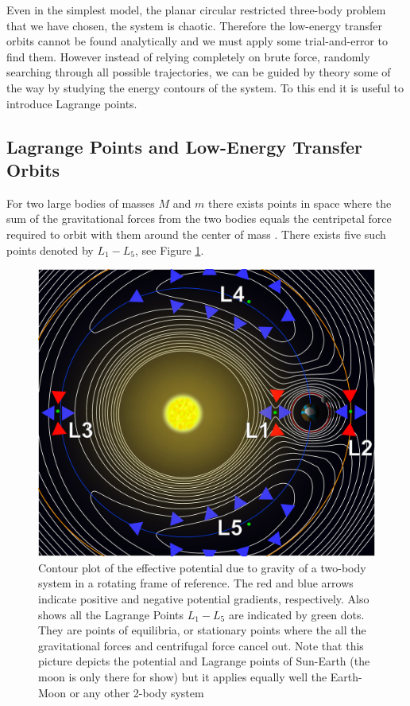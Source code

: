 Even in the simplest model, the planar circular restricted three-body problem that we have chosen, the system is chaotic. Therefore the low-energy transfer orbits cannot be found analytically and we must apply some trial-and-error to find them. However instead of relying completely on brute force, randomly searching through all possible trajectories, we can be guided by theory some of the way by studying the energy contours of the system. To this end it is useful to introduce Lagrange points.

\subsection{Lagrange Points and Low-Energy Transfer Orbits}
For two large bodies of masses $M$ and $m$ there exists points in space where the sum of the gravitational forces from the two bodies equals the centripetal force required to orbit with them around the center of mass \cite{Murray1999}. There exists five such points denoted by $L_1 - L_5$, see Figure \ref{fig:lagrange-points}.

\begin{figure}[ht]
\centering
\includegraphics[scale=0.32]{fig/lagrange_points.pdf}
\caption{Contour plot of the effective potential due to gravity of a two-body system in a rotating frame of reference. The red and blue arrows indicate positive and negative potential gradients, respectively. Also shows all the Lagrange Points $L_1-L_5$ are indicated by green dots. They are points of equilibria, or stationary points where the all the gravitational forces and centrifugal force cancel out. Note that this picture depicts the potential and Lagrange points of Sun-Earth (the moon is only there for show) but it applies equally well the Earth-Moon or any other 2-body system}
\label{fig:lagrange-points}
\end{figure}

